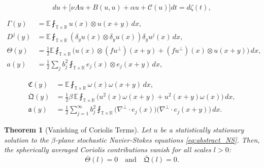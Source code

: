 \documentclass[10pt,a4paper]{amsart}
\newtheorem{theorem}{Theorem}
\begin{document}
\begin{equation}\label{eq:abstract_NS}
    du + \big[ \nu A u + B(u,u) + \alpha u + \mathcal{C}(u) \big] dt = d\zeta(t),
\end{equation}

\begin{align}
    \Gamma(y) &= \mathbb{E} \fint_{\mathbb{T} \times \mathbb{R}} u(x) \otimes u(x+y) \, dx, \label{def:Gamma}\\
    D^j(y) &= \mathbb{E} \fint_{\mathbb{T} \times \mathbb{R}} (\delta_y u(x) \otimes \delta_y u(x)) \delta_y u^j(x) \, dx, \label{def:Dj}\\
    \varTheta(y) &= \frac{1}{2}\mathbb{E} \fint_{\mathbb{T} \times \mathbb{R}} \big( u(x) \otimes (f u^\perp)(x+y) + (f u^\perp)(x) \otimes u(x+y) \big) \, dx, \label{def:Theta}\\
    a(y) &= \frac{1}{2}\sum_{j} b_j^2 \fint_{\mathbb{T}\times \mathbb{R}} e_j(x) \otimes e_j(x+y) \, dx, \label{def:a}
\end{align}

\begin{align}
    \mathfrak{C}(y) &= \mathbb{E}\fint_{\mathbb{T}\times \mathbb{R}} \omega(x)\omega(x+y) \, dx, \label{def:vorticity_corr}\\
    \mathfrak{Q}(y) &= \frac{1}{2}\beta \, \mathbb{E}\fint_{\mathbb{T}\times \mathbb{R}} \big( u^2(x)\omega(x+y) + u^2(x+y)\omega(x) \big) \, dx, \label{def:coriolis_vort_corr}\\
    \mathfrak{a}(y) &= \frac{1}{2}\sum_{j=1}^\infty b_j^2\fint_{\mathbb{T}\times \mathbb{R}} \big(\nabla^\perp \cdot e_j(x)\big)\big(\nabla^\perp \cdot e_j(x+y)\big) \, dx. \label{def:noise_curl_corr}
\end{align}

\begin{theorem}[Vanishing of Coriolis Terms]\label{thm:vanishing_coriolis}
Let $u$ be a statistically stationary solution to the $\beta$-plane stochastic Navier-Stokes equations \eqref{eq:abstract_NS}. Then, the spherically averaged Coriolis contributions vanish for all scales $l > 0$:
\begin{equation}
    \overline{\varTheta}(l) = 0 \quad \text{and} \quad \overline{\mathfrak{Q}}(l) = 0.
\end{equation}
\end{theorem}
\end{document}
